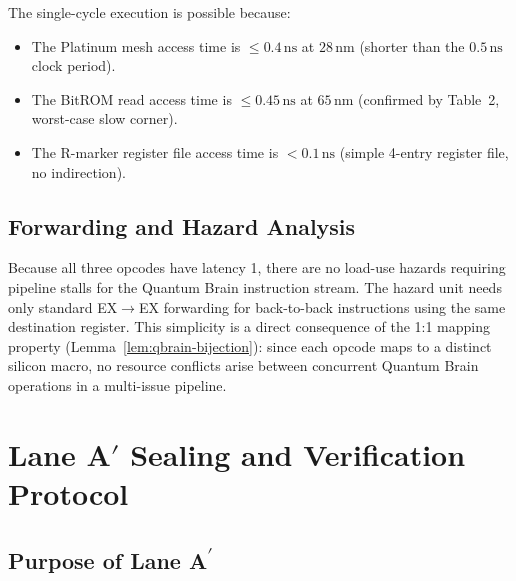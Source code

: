 The single-cycle execution is possible because:
\begin{itemize}
  \item The Platinum mesh access time is $\leq 0.4\,\text{ns}$ at $28\,\text{nm}$
        (shorter than the $0.5\,\text{ns}$ clock period).
  \item The BitROM read access time is $\leq 0.45\,\text{ns}$ at $65\,\text{nm}$
        (confirmed by \cite{bitrom_2025} Table~2, worst-case slow corner).
  \item The R-marker register file access time is $< 0.1\,\text{ns}$
        (simple 4-entry register file, no indirection).
\end{itemize}

\subsection{Forwarding and Hazard Analysis}

Because all three opcodes have latency 1, there are no load-use hazards
requiring pipeline stalls for the Quantum Brain instruction stream.
The hazard unit needs only standard EX$\to$EX forwarding for back-to-back
instructions using the same destination register.
This simplicity is a direct consequence of the 1:1 mapping property
(Lemma~\ref{lem:qbrain-bijection}): since each opcode maps to a distinct
silicon macro, no resource conflicts arise between concurrent Quantum Brain
operations in a multi-issue pipeline.


\section{Lane A\texorpdfstring{$'$}{prime} Sealing and Verification Protocol}
\label{sec:flos77-lane-a}

\subsection{Purpose of Lane A\textsuperscript{$'$}}

